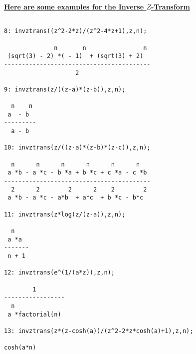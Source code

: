 \underline {{\bf Here are some examples for the Inverse $Z$-Transform}}
\begin{verbatim}

8: invztrans((z^2-2*z)/(z^2-4*z+1),z,n);

              n       n                n
 (sqrt(3) - 2) *( - 1)  + (sqrt(3) + 2)
-----------------------------------------
                    2

9: invztrans(z/((z-a)*(z-b)),z,n);

  n    n
 a  - b
---------
  a - b

10: invztrans(z/((z-a)*(z-b)*(z-c)),z,n);

  n      n      n      n      n      n
 a *b - a *c - b *a + b *c + c *a - c *b
-----------------------------------------
  2      2        2      2    2        2
 a *b - a *c - a*b  + a*c  + b *c - b*c

11: invztrans(z*log(z/(z-a)),z,n);

  n
 a *a
-------
 n + 1

12: invztrans(e^(1/(a*z)),z,n);

        1
-----------------
  n
 a *factorial(n)

13: invztrans(z*(z-cosh(a))/(z^2-2*z*cosh(a)+1),z,n);

cosh(a*n)


\end{verbatim}

